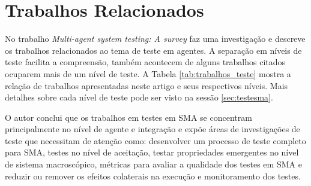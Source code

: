 \chapter{Trabalhos Relacionados}

No trabalho \textit{Multi-agent system testing: A survey} \citet{houhamdi2011multi} faz uma investigação e descreve os trabalhos relacionados ao tema de teste em agentes. A separação em níveis de teste facilita a compreensão, também acontecem de alguns trabalhos citados ocuparem mais de um nível de teste. A Tabela \ref{tab:trabalhos_teste} mostra a relação de trabalhos apresentadas neste artigo e seus respectivos níveis. Mais detalhes sobre cada nível de teste pode ser visto na sessão \ref{sec:testesma}.

O autor conclui que os trabalhos em testes em SMA se concentram principalmente no nível de agente e integração e expõe áreas de investigações de teste que necessitam de atenção como: desenvolver um processo de teste completo para SMA, testes no nível de aceitação, testar propriedades emergentes no nível de sistema macroscópico, métricas para avaliar a qualidade dos testes em SMA e reduzir ou remover os efeitos colaterais na execução e monitoramento dos testes.

